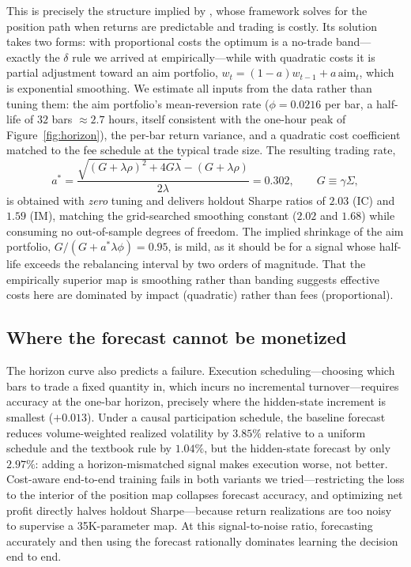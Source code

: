 \documentclass[12pt]{article}
\begin{document}
This is precisely the structure implied by \citet{garleanu2013dynamic}, whose
framework solves for the position path when returns are predictable and trading
is costly. Its solution takes two forms: with proportional costs the optimum is
a no-trade band---exactly the $\delta$ rule we arrived at empirically---while
with quadratic costs it is partial adjustment toward an aim portfolio,
$w_t = (1-a)w_{t-1} + a\,\mathrm{aim}_t$, which is exponential smoothing. We
estimate all inputs from the data rather than tuning them: the aim portfolio's
mean-reversion rate ($\phi = 0.0216$ per bar, a half-life of $32$ bars
$\approx 2.7$ hours, itself consistent with the one-hour peak of
Figure~\ref{fig:horizon}), the per-bar return variance, and a quadratic cost
coefficient matched to the fee schedule at the typical trade size. The
resulting trading rate,
\begin{equation}
a^{*} = \frac{\sqrt{(G+\lambda\rho)^2 + 4G\lambda} - (G+\lambda\rho)}{2\lambda}
= 0.302, \qquad G \equiv \gamma\Sigma,
\end{equation}
is obtained with \emph{zero} tuning and delivers holdout Sharpe ratios of
$2.03$ (IC) and $1.59$ (IM), matching the grid-searched smoothing constant
($2.02$ and $1.68$) while consuming no out-of-sample degrees of freedom. The
implied shrinkage of the aim portfolio, $G/(G+a^{*}\lambda\phi) = 0.95$, is
mild, as it should be for a signal whose half-life exceeds the rebalancing
interval by two orders of magnitude. That the empirically superior map is
smoothing rather than banding suggests effective costs here are dominated by
impact (quadratic) rather than fees (proportional).

\subsection{Where the forecast cannot be monetized}
The horizon curve also predicts a failure. Execution scheduling---choosing
which bars to trade a fixed quantity in, which incurs no incremental
turnover---requires accuracy at the one-bar horizon, precisely where the
hidden-state increment is smallest ($+0.013$). Under a causal participation
schedule, the baseline forecast reduces volume-weighted realized volatility by
$3.85\%$ relative to a uniform schedule and the textbook rule by $1.04\%$, but
the hidden-state forecast by only $2.97\%$: adding a horizon-mismatched signal
makes execution worse, not better. Cost-aware end-to-end training fails in both
variants we tried---restricting the loss to the interior of the position map
collapses forecast accuracy, and optimizing net profit directly halves holdout
Sharpe---because return realizations are too noisy to supervise a
35K-parameter map. At this signal-to-noise ratio, forecasting accurately and
then using the forecast rationally dominates learning the decision end to end.
\end{document}
